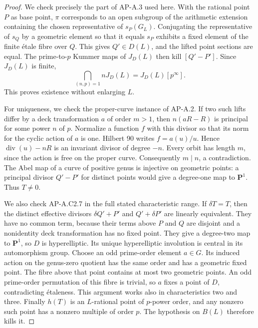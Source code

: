 \begin{proof}
We check precisely the part of AP-A.3 used here.  With the rational point
$P$ as base point, $\pi$ corresponds to an open subgroup of the arithmetic
extension containing the chosen representative of $s_P(G_L)$.  Conjugating
the representative of $s_Q$ by a geometric element so that it equals $s_P$
exhibits a fixed element of the finite \'etale fibre over $Q$.  This gives
$Q'\in D(L)$, and the lifted point sections are equal.  The prime-to-$p$
Kummer maps of $J_D(L)$ then kill $[Q'-P']$.  Since $J_D(L)$ is finite,
\[
            \bigcap_{(n,p)=1} nJ_D(L)=J_D(L)[p^\infty].
\]
This proves existence without enlarging $L$.

For uniqueness, we check the proper-curve instance of AP-A.2.  If two such
lifts differ by a deck transformation $a$ of order $m>1$, then
$n(aR-R)$ is principal for some power $n$ of $p$.  Normalize a function
$f$ with this divisor so that its norm for the cyclic action of $a$ is
one.  Hilbert 90 writes $f=a(u)/u$.  Hence
$\operatorname{div}(u)-nR$ is an invariant divisor of degree $-n$.
Every orbit has length $m$, since the action is free on the proper curve.
Consequently $m\mid n$, a contradiction.  The Abel map of a curve of
positive genus is injective on geometric points: a principal divisor
$Q'-P'$ for distinct points would give a degree-one map to $\mathbf P^1$.
Thus $T\ne0$.

We also check AP-A.C2.7 in the full stated characteristic range.  If
$\delta T=T$, then the distinct effective divisors
$\delta Q'+P'$ and $Q'+\delta P'$ are linearly equivalent.  They have no
common term, because their terms above $P$ and $Q$ are disjoint and a
nonidentity deck transformation has no fixed point.  They give a degree-two
map to $\mathbf P^1$, so $D$ is hyperelliptic.  Its unique hyperelliptic
involution is central in its automorphism group.  Choose an odd prime-order
element $a\in G$.  Its induced action on the genus-zero quotient has the
same order and has a geometric fixed point.  The fibre above that point
contains at most two geometric points.  An odd prime-order permutation of
this fibre is trivial, so $a$ fixes a point of $D$, contradicting \'etaleness.
This argument works also in characteristics two and three.  Finally $h(T)$
is an $L$-rational point of $p$-power order, and any nonzero such point has a
nonzero multiple of order $p$.  The hypothesis on $B(L)$ therefore kills it.
\end{proof}

